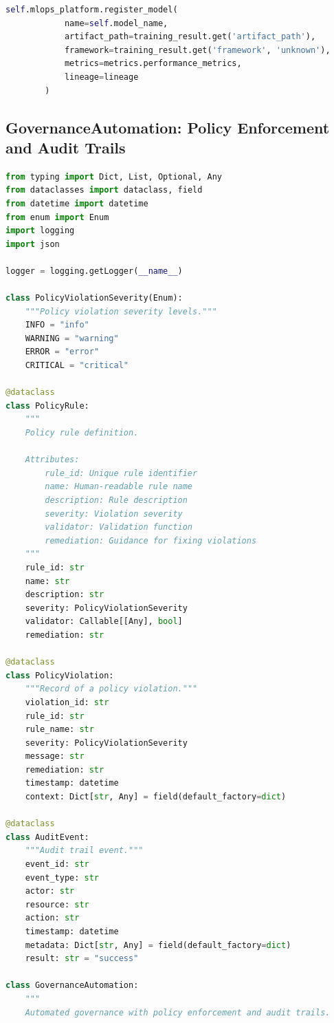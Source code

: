 \begin{lstlisting}[language=Python, caption={Automated Training with Adaptive Retraining Strategies}]
        self.mlops_platform.register_model(
            name=self.model_name,
            artifact_path=training_result.get('artifact_path'),
            framework=training_result.get('framework', 'unknown'),
            metrics=metrics.performance_metrics,
            lineage=lineage
        )
\end{lstlisting}

\subsection{GovernanceAutomation: Policy Enforcement and Audit Trails}

\begin{lstlisting}[language=Python, caption={Automated Governance with Policy Enforcement}]
from typing import Dict, List, Optional, Any
from dataclasses import dataclass, field
from datetime import datetime
from enum import Enum
import logging
import json

logger = logging.getLogger(__name__)

class PolicyViolationSeverity(Enum):
    """Policy violation severity levels."""
    INFO = "info"
    WARNING = "warning"
    ERROR = "error"
    CRITICAL = "critical"

@dataclass
class PolicyRule:
    """
    Policy rule definition.

    Attributes:
        rule_id: Unique rule identifier
        name: Human-readable rule name
        description: Rule description
        severity: Violation severity
        validator: Validation function
        remediation: Guidance for fixing violations
    """
    rule_id: str
    name: str
    description: str
    severity: PolicyViolationSeverity
    validator: Callable[[Any], bool]
    remediation: str

@dataclass
class PolicyViolation:
    """Record of a policy violation."""
    violation_id: str
    rule_id: str
    rule_name: str
    severity: PolicyViolationSeverity
    message: str
    remediation: str
    timestamp: datetime
    context: Dict[str, Any] = field(default_factory=dict)

@dataclass
class AuditEvent:
    """Audit trail event."""
    event_id: str
    event_type: str
    actor: str
    resource: str
    action: str
    timestamp: datetime
    metadata: Dict[str, Any] = field(default_factory=dict)
    result: str = "success"

class GovernanceAutomation:
    """
    Automated governance with policy enforcement and audit trails.


\end{lstlisting}
